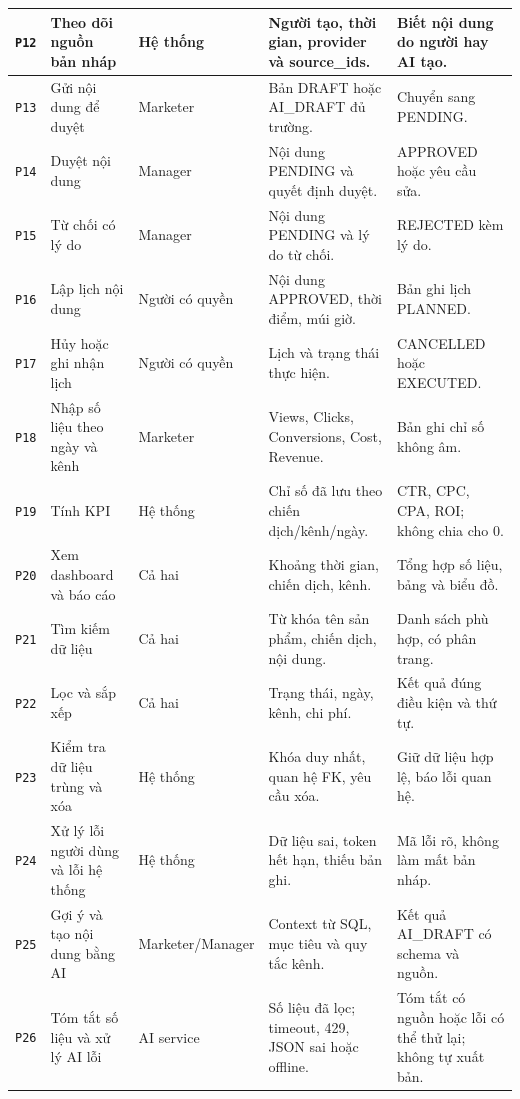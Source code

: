 \begin{longtable}{|C{0.8cm}|L{4.1cm}|C{1.8cm}|L{4.1cm}|L{3.7cm}|}
\texttt{P12} & Theo dõi nguồn bản nháp & Hệ thống & Người tạo, thời gian, provider và source\_ids. & Biết nội dung do người hay AI tạo.\\\hline
\texttt{P13} & Gửi nội dung để duyệt & Marketer & Bản DRAFT hoặc AI\_DRAFT đủ trường. & Chuyển sang PENDING.\\\hline
\texttt{P14} & Duyệt nội dung & Manager & Nội dung PENDING và quyết định duyệt. & APPROVED hoặc yêu cầu sửa.\\\hline
\texttt{P15} & Từ chối có lý do & Manager & Nội dung PENDING và lý do từ chối. & REJECTED kèm lý do.\\\hline
\texttt{P16} & Lập lịch nội dung & Người có quyền & Nội dung APPROVED, thời điểm, múi giờ. & Bản ghi lịch PLANNED.\\\hline
\texttt{P17} & Hủy hoặc ghi nhận lịch & Người có quyền & Lịch và trạng thái thực hiện. & CANCELLED hoặc EXECUTED.\\\hline
\texttt{P18} & Nhập số liệu theo ngày và kênh & Marketer & Views, Clicks, Conversions, Cost, Revenue. & Bản ghi chỉ số không âm.\\\hline
\texttt{P19} & Tính KPI & Hệ thống & Chỉ số đã lưu theo chiến dịch/kênh/ngày. & CTR, CPC, CPA, ROI; không chia cho 0.\\\hline
\texttt{P20} & Xem dashboard và báo cáo & Cả hai & Khoảng thời gian, chiến dịch, kênh. & Tổng hợp số liệu, bảng và biểu đồ.\\\hline
\texttt{P21} & Tìm kiếm dữ liệu & Cả hai & Từ khóa tên sản phẩm, chiến dịch, nội dung. & Danh sách phù hợp, có phân trang.\\\hline
\texttt{P22} & Lọc và sắp xếp & Cả hai & Trạng thái, ngày, kênh, chi phí. & Kết quả đúng điều kiện và thứ tự.\\\hline
\texttt{P23} & Kiểm tra dữ liệu trùng và xóa & Hệ thống & Khóa duy nhất, quan hệ FK, yêu cầu xóa. & Giữ dữ liệu hợp lệ, báo lỗi quan hệ.\\\hline
\texttt{P24} & Xử lý lỗi người dùng và lỗi hệ thống & Hệ thống & Dữ liệu sai, token hết hạn, thiếu bản ghi. & Mã lỗi rõ, không làm mất bản nháp.\\\hline
\texttt{P25} & Gợi ý và tạo nội dung bằng AI & Marketer/Manager & Context từ SQL, mục tiêu và quy tắc kênh. & Kết quả AI\_DRAFT có schema và nguồn.\\\hline
\texttt{P26} & Tóm tắt số liệu và xử lý AI lỗi & AI service & Số liệu đã lọc; timeout, 429, JSON sai hoặc offline. & Tóm tắt có nguồn hoặc lỗi có thể thử lại; không tự xuất bản.\\\hline
\end{longtable}
\endgroup

